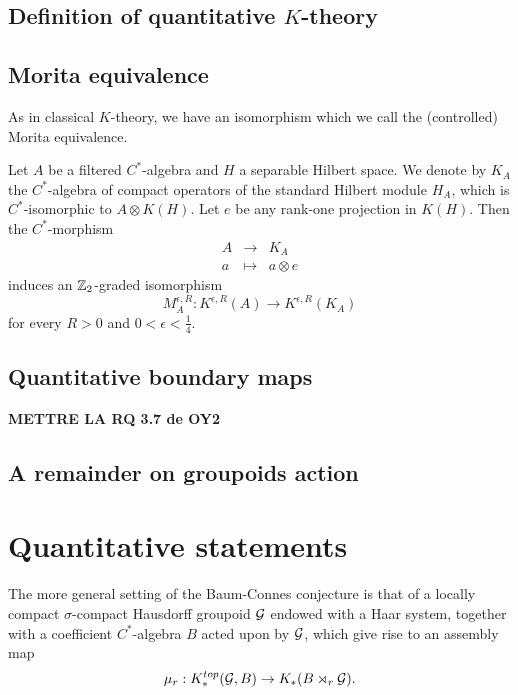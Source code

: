 \subsection{Definition of quantitative $K$-theory} 

\subsection{Morita equivalence}

As in classical $K$-theory, we have an isomorphism which we call the (controlled) Morita equivalence.
\begin{prop}
Let $A$ be a filtered $C^*$-algebra and $H$ a separable Hilbert space. We denote by $K_A$ the $C^*$-algebra of compact operators of the standard Hilbert module $H_A$, which is $C^*$-isomorphic to $A\otimes K(H)$. Let $e$ be any rank-one projection in $K(H)$. Then the $C^*$-morphism 
\[\begin{array}{lll} A & \rightarrow & K_A \\ a &\mapsto & a\otimes e\end{array}\]
induces an $\mathbb Z_2$-graded isomorphism
\[M_A^{\epsilon, R} : K^{\epsilon , R}(A)\rightarrow K^{\epsilon , R}(K_A)\]
for every $R>0$ and $0< \epsilon <\frac{1}{4}$.
\end{prop}

\subsection{Quantitative boundary maps}
\textbf{METTRE LA RQ 3.7 de OY2}

\subsection{A remainder on groupoids action}

\section{Quantitative statements}

The more general setting of the Baum-Connes conjecture \cite{TuBC} is that of a locally compact $\sigma$-compact Hausdorff groupoid $\mathcal G$ endowed with a Haar system, together with a coefficient $C^*$-algebra $B$ acted upon by $\mathcal G$, which give rise to an assembly map
\[\mu_r : K^{top}_*(\mathcal G,B)\rightarrow K_*(B\rtimes_r \mathcal G).\]

